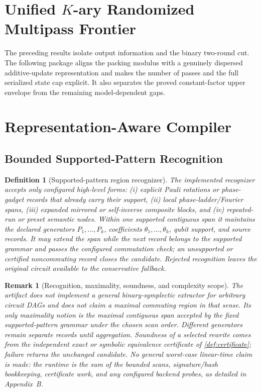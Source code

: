 \documentclass[aps,prx,reprint,floatfix,superscriptaddress]{revtex4-2}
\newtheorem{definition}{Definition}
\newtheorem{remark}{Remark}
\begin{document}
\section{Unified $K$-ary Randomized Multipass Frontier}
\label{sec:w1-unified-frontier}

The preceding results isolate output information and the binary two-round
cut.  The following package aligns the packing modulus with a genuinely
dispersed additive-update representation and makes the number of passes
and the full serialized state cap explicit.  It also separates the proved
constant-factor upper envelope from the remaining model-dependent gaps.







\section{Representation-Aware Compiler}
\label{sec:compiler}

\subsection{Bounded Supported-Pattern Recognition}

\begin{definition}[Supported-pattern region recognizer]
\label{def:region-discovery}
The implemented recognizer accepts only configured high-level forms:
(i) explicit Pauli rotations or phase-gadget records that already carry
their support, (ii) local phase-ladder/Fourier spans, (iii) expanded
mirrored or self-inverse composite blocks, and (iv) repeated-run or preset
semantic nodes.  Within one supported contiguous span it maintains the
declared generators $P_1,\ldots,P_k$, coefficients
$\theta_1,\ldots,\theta_k$, qubit support, and source records.  It may extend
the span while the next record belongs to the supported grammar and passes
the configured commutation check; an unsupported or certified
noncommuting record closes the candidate.  Rejected recognition leaves the
original circuit available to the conservative fallback.
\end{definition}

\begin{remark}[Recognition, maximality, soundness, and complexity scope]
\label{rem:discovery-scope}
The artifact does not implement a general binary-symplectic extractor for
arbitrary circuit DAGs and does not claim a maximal commuting region in
that sense.  Its only maximality notion is the maximal contiguous span
accepted by the fixed supported-pattern grammar under the chosen scan
order.  Different generators remain separate records until aggregation.
Soundness of a selected rewrite comes from the independent exact or
symbolic equivalence certificate of \cref{def:certificate}; failure returns
the unchanged candidate.  No general worst-case linear-time claim is made:
the runtime is the sum of the bounded scans, signature/hash bookkeeping,
certificate work, and any configured backend probes, as detailed in
Appendix~B.
\end{remark}
\end{document}
